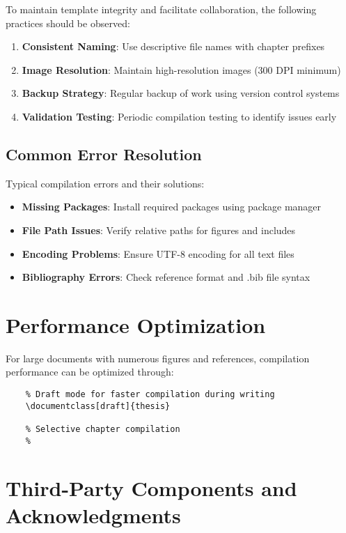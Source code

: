 To maintain template integrity and facilitate collaboration, the following practices should be observed:

\begin{enumerate}
	\item \textbf{Consistent Naming}: Use descriptive file names with chapter prefixes
	\item \textbf{Image Resolution}: Maintain high-resolution images (300 DPI minimum)
	\item \textbf{Backup Strategy}: Regular backup of work using version control systems
	\item \textbf{Validation Testing}: Periodic compilation testing to identify issues early
\end{enumerate}

\subsection{Common Error Resolution}
\label{subsec:error_resolution}

Typical compilation errors and their solutions:

\begin{itemize}
	\item \textbf{Missing Packages}: Install required packages using package manager
	\item \textbf{File Path Issues}: Verify relative paths for figures and includes
	\item \textbf{Encoding Problems}: Ensure UTF-8 encoding for all text files
	\item \textbf{Bibliography Errors}: Check reference format and .bib file syntax
\end{itemize}

\section{Performance Optimization}
\label{sec:performance}

For large documents with numerous figures and references, compilation performance can be optimized through:

\begin{verbatim}
	% Draft mode for faster compilation during writing
	\documentclass[draft]{thesis}
	
	% Selective chapter compilation
	%
\end{verbatim}

\section{Third-Party Components and Acknowledgments}
\label{sec:acknowledgments}

